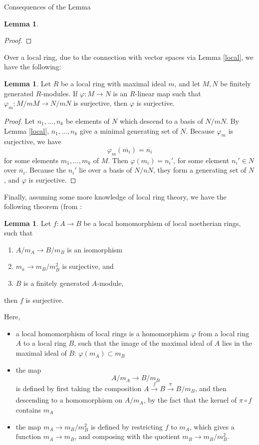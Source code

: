 \documentclass[12pt]{article}
\theoremstyle{definition}
\newtheorem{lemma}[definition]{Lemma}
\begin{document}
\begin{section}{Consequences of the Lemma}
\begin{lemma}
\begin{proof}
		\end{proof}
	\end{lemma}
	Over a local ring, due to the connection with vector spaces via Lemma \ref{local}, we have the following:
	\begin{lemma}
		Let $R$ be a local ring with maximal ideal $m$, and let $M, N$ be finitely generated $R$-modules. If $\varphi: M \to N$ is an $R$-linear map such that $\varphi_m : M/mM \to N/mN$ is surjective, then $\varphi$ is surjective.
	\begin{proof}
		Let $n_1, \dots, n_k$ be elements of $N$ which descend to a basis of $N/mN$. By Lemma \ref{local}, $n_1, \dots , n_k$ give a minimal generating set of $N$. Because $\varphi_m$ is surjective, we have
		\[\varphi_m(\overline{m_i}) = \overline{n_i}\]
		for some elements $m_1, \dots, m_k$ of $M$. Then $\varphi(m_i) = n_i'$, for some element $n_i' \in N$ over $\overline{n_i}$. Because the $n_i'$ lie over a basis of $N/nN$, they form a generating set of $N$, and $\varphi$ is surjective.
	\end{proof}
		\label{epi}
	\end{lemma}
	Finally, assuming some more knowledge of local ring theory, we have the following theorem (from \cite{hartshorne}:
		\begin{lemma}
			Let $f: A \to B$ be a local homomorphism of local noetherian rings, such that	
			\begin{enumerate}[label=\alph*.]
				\item $A/m_A \to B/m_B$ is an isomorphism
				\item $m_a \to m_B/m_B^2$ is surjective, and 
				\item $B$ is a finitely generated $A$-module,
			\end{enumerate}
			then $f$ is surjective.
			\par Here, 
			\begin{itemize} \item a local homomorphism of local rings is a homomorphism $\varphi$ from a local ring $A$ to a local ring $B$, such that the image of the maximal ideal of $A$ lies in the maximal ideal of $B$: $\varphi(m_A) \subset m_B$ \item the map
			\[A/m_A \to B/m_B\]
			is defined by first taking the composition $A \xrightarrow[]{f} B \xrightarrow[]{\pi} B/m_B$, and then descending to a homomorphism on $A/m_A$, by the fact that the kernel of $\pi \circ f$ contains $m_A$
		\item the map $m_A \to m_B / m_B^2$ is defined by restricting $f$ to $m_A$, which gives a function $m_A \to m_B$, and composing with the quotient $m_B \to m_B/m_B^2$.

\end{itemize}
\end{lemma}
\end{section}
\end{document}

